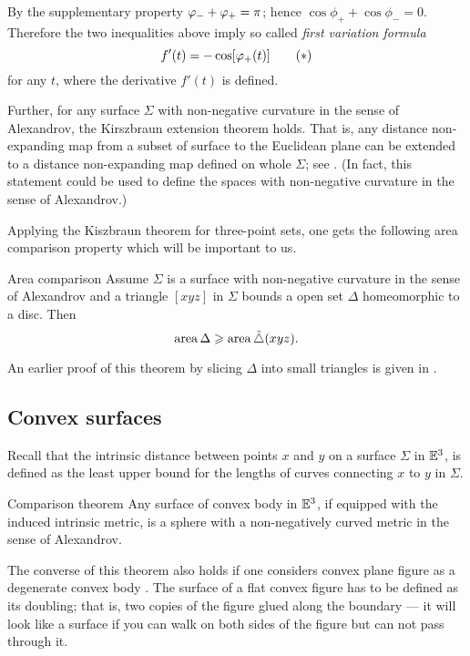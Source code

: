\documentclass[oneside,a4paper, 12pt]{article}
\begin{document}
By the supplementary property $\phi_-\z+\phi_+=\pi$;
hence $\cos\phi_+ +\cos\phi_-=0$.
Therefore the two inequalities above imply so called \emph{first variation formula}
\begin{equation}
	\label{eq:first variation}
f'(t)=-\cos[\phi_+(t)]
	\tag{${*}$}
\end{equation}
for any $t$, where the derivative $f'(t)$ is defined.

Further, for any surface $\Sigma$ with non-negative curvature in the sense of Alexandrov,
the Kirszbraun extension theorem holds.
That is, any distance non-expanding map from a subset of surface to the Euclidean plane can be extended to a distance non-expanding map defined on whole $\Sigma$;
see \cite{LS, AKP}.
(In fact, this statement could be used to define the spaces with non-negative curvature in the sense of Alexandrov.)

Applying the Kiszbraun theorem for three-point sets,
one gets the following area comparison property which will be important to us.

\begin{thm}{Area comparison}\label{Area comparison}
Assume $\Sigma$ is a surface with non-negative curvature in the sense of Alexandrov
and a triangle $[xyz]$ in $\Sigma$ bounds a open set $\Delta$ homeomorphic to a disc.
Then 
\[\mathop{\rm area}\nolimits\Delta\geqslant \mathop{\rm area}\nolimits\tilde\triangle(xyz).\]
\end{thm}
An earlier proof of this theorem by slicing $\Delta$ into small triangles is given in \cite[X \S 1]{ aleksandrov1948vnutrennnyaya}.

\subsection*{Convex surfaces}

Recall that the intrinsic distance between points $x$ and $y$ on a surface $\Sigma$ in $\mathbb{E}^3$, is defined as the least upper bound for the lengths of curves connecting $x$ to $y$ in $\Sigma$.

\begin{thm}{Comparison theorem}\label{Comparison theorem}
Any surface of convex body in $\mathbb{E}^3$,
if equipped with the induced intrinsic metric, 
is a sphere with a non-negatively curved metric in the sense of Alexandrov.
\end{thm}

The converse of this theorem also holds
if one considers convex plane figure as a degenerate convex body \cite[III \S 3]{aleksandrov1948vnutrennnyaya}.
The surface of a flat convex figure has to be defined as its doubling;
that is, two copies 
of the figure glued along the boundary --- it will look like a surface if you can walk on both sides of the figure but can not pass through it.
\end{document}
